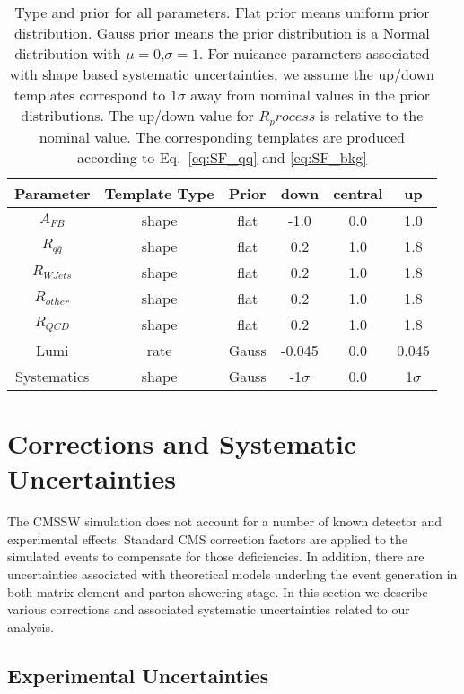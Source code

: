 \documentclass{cmspaperpdf}
\begin{document}
\begin{table}[htb]
\centering
\begin{tabular}{|c|c c|c c c|}
\hline
Parameter     & Template Type & Prior         & down  & central  & up    \\ \hline
$A_{FB}$      & shape         & flat         & -1.0  & 0.0  & 1.0   \\
$R_{q\bar{q}}$ & shape         & flat         & 0.2  & 1.0  & 1.8   \\ \hline\hline
$R_{WJets}$   & shape         & flat        & 0.2   & 1.0   & 1.8  \\ 
$R_{other}$   & shape         & flat         & 0.2   & 1.0  & 1.8  \\
$R_{QCD}$     & shape         & flat         & 0.2   & 1.0  & 1.8  \\
Lumi          & rate          & Gauss      & -0.045 & 0.0   & 0.045 \\
Systematics   & shape         & Gauss      & -1$\sigma$ & 0.0 & 1$\sigma$ \\ \hline\hline
\end{tabular}
\caption{Type and prior for all parameters. Flat prior means uniform prior distribution. Gauss prior means the prior distribution is a Normal distribution with $\mu=0$,$\sigma=1$. For nuisance parameters associated with shape based systematic uncertainties, we assume the up/down templates correspond to $1 \sigma$ away from nominal values in the prior distributions. The up/down value for $R_process$ is relative to the nominal value. The corresponding templates are produced according to Eq.~\ref{eq:SF_qq} and \ref{eq:SF_bkg} }
\label{table:priors}
\end{table}

\section{Corrections and Systematic Uncertainties}
\label{sec:corrections}

The CMSSW simulation does not account for a number of known detector and experimental effects.  Standard CMS correction factors are applied to the simulated events to compensate for those deficiencies. In addition, there are uncertainties associated with theoretical models underling the event generation in both matrix element and parton showering stage. In this section we describe various corrections and associated systematic uncertainties related to our analysis.

\subsection{Experimental Uncertainties}
\end{document}
